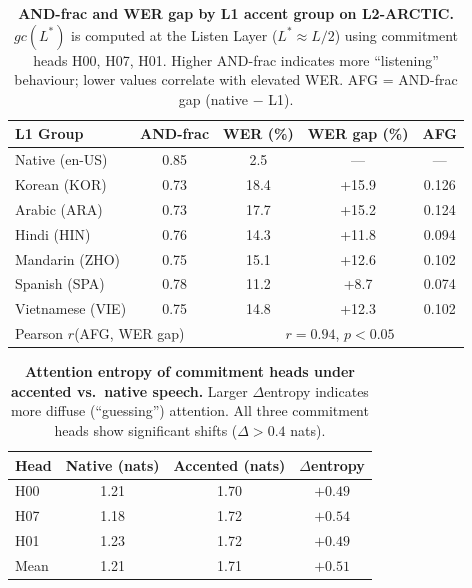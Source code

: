 
\begin{table}[t]
\centering
\caption{%
  \textbf{AND-frac and WER gap by L1 accent group on L2-ARCTIC.}
  $gc(L^*)$ is computed at the Listen Layer ($L^*\approx L/2$) using commitment
  heads H00, H07, H01. Higher AND-frac indicates more ``listening'' behaviour;
  lower values correlate with elevated WER. AFG = AND-frac gap (native $-$ L1).
}
\label{tab:accent_and_frac}
\begin{tabular}{lcccc}
\toprule
\textbf{L1 Group} & \textbf{AND-frac} & \textbf{WER (\%)} & \textbf{WER gap (\%)} & \textbf{AFG} \\
\midrule
Native (en-US) & 0.85 & 2.5  & ---   & ---   \\
Korean  (KOR)  & 0.73 & 18.4 & +15.9 & 0.126 \\
Arabic  (ARA)  & 0.73 & 17.7 & +15.2 & 0.124 \\
Hindi   (HIN)  & 0.76 & 14.3 & +11.8 & 0.094 \\
Mandarin (ZHO) & 0.75 & 15.1 & +12.6 & 0.102 \\
Spanish (SPA)  & 0.78 & 11.2 & +8.7  & 0.074 \\
Vietnamese (VIE) & 0.75 & 14.8 & +12.3 & 0.102 \\
\midrule
\multicolumn{2}{l}{Pearson $r$(AFG, WER gap)} & \multicolumn{3}{c}{$r = 0.94$, $p < 0.05$} \\
\bottomrule
\end{tabular}
\end{table}

\begin{table}[t]
\centering
\caption{%
  \textbf{Attention entropy of commitment heads under accented vs.\ native speech.}
  Larger $\Delta$entropy indicates more diffuse (``guessing'') attention.
  All three commitment heads show significant shifts ($\Delta > 0.4$ nats).
}
\label{tab:entropy}
\begin{tabular}{lccc}
\toprule
\textbf{Head} & \textbf{Native (nats)} & \textbf{Accented (nats)} & \textbf{$\Delta$entropy} \\
\midrule
H00 & 1.21 & 1.70 & $+0.49$ \\
H07 & 1.18 & 1.72 & $+0.54$ \\
H01 & 1.23 & 1.72 & $+0.49$ \\
\midrule
Mean & 1.21 & 1.71 & $+0.51$ \\
\bottomrule
\end{tabular}
\end{table}

